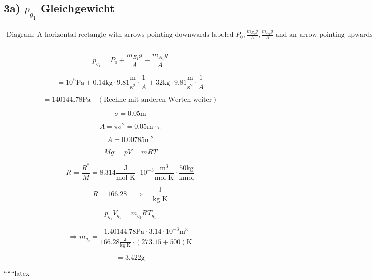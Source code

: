\subsection*{3a) $p_{g_1}$ Gleichgewicht}

\[
\begin{array}{c}
\text{Diagram: A horizontal rectangle with arrows pointing downwards labeled } P_0, \frac{m_{E_1}g}{A}, \frac{m_{A_1}g}{A} \text{ and an arrow pointing upwards labeled } qg_{g_1}. \\
\end{array}
\]

\[
p_{g_1} = P_0 + \frac{m_{E_1}g}{A} + \frac{m_{A_1}g}{A}
\]

\[
= 10^5 \text{Pa} + 0.14 \text{kg} \cdot 9.81 \frac{\text{m}}{\text{s}^2} \cdot \frac{1}{A} + 32 \text{kg} \cdot 9.81 \frac{\text{m}}{\text{s}^2} \cdot \frac{1}{A}
\]

\[
= 140144.78 \text{Pa} \quad (\text{Rechne mit anderen Werten weiter})
\]

\[
\sigma = 0.05 \text{m}
\]

\[
A = \pi \sigma^2 = 0.05 \text{m} \cdot \pi
\]

\[
A = 0.00785 \text{m}^2
\]

\[
Mg: \quad pV = mRT
\]

\[
R = \frac{R^*}{M} = 8.314 \frac{\text{J}}{\text{mol K}} \cdot 10^{-3} \frac{\text{m}^3}{\text{mol K}} \cdot \frac{50 \text{kg}}{\text{kmol}}
\]

\[
R = 166.28 \quad \Rightarrow \quad \frac{\text{J}}{\text{kg K}}
\]

\[
p_{g_1} V_{g_1} = m_{g_2} R T_{g_1}
\]

\[
\Rightarrow m_{g_2} = \frac{1.40144.78 \text{Pa} \cdot 3.14 \cdot 10^{-3} \text{m}^3}{166.28 \frac{\text{J}}{\text{kg K}} \cdot (273.15 + 500) \text{K}}
\]

\[
= 3.422 \text{g}
\]

``````latex
